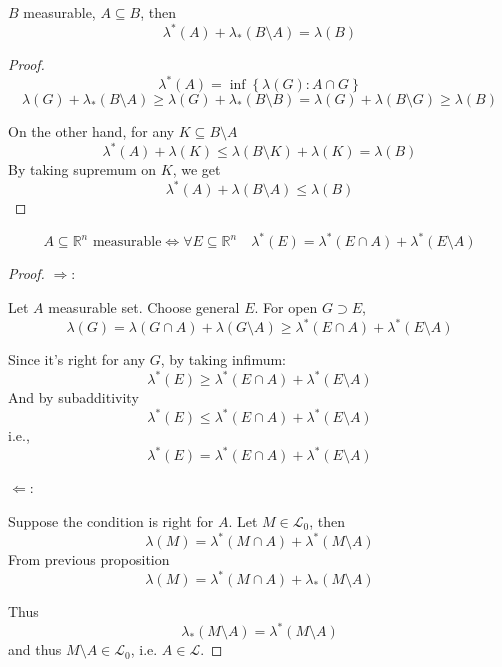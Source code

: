 \begin{prop}
	$B$ measurable, $A\subseteq B$, then
	$$\lambda^*(A) + \lambda_*(B\setminus A) = \lambda(B)$$
	\begin{proof}
		$$\lambda^*(A) = \inf\left\{ \lambda(G) : A\cap G   \right\} $$
		$$\lambda(G) + \lambda_*(B\setminus A) \geq \lambda(G) + \lambda_*(B\setminus B) = \lambda(G) + \lambda(B\setminus G) \geq \lambda(B)$$
		
		
		On the other hand, for any $K\subseteq B\setminus A$
		$$\lambda^*(A) + \lambda(K) \leq \lambda(B\setminus K)+ \lambda(K) = \lambda(B)$$
		By taking supremum on $K$, we get
		$$\lambda^*(A) + \lambda(B\setminus A) \leq  \lambda(B)$$
	\end{proof}


\end{prop}

\begin{prop}
	$$A\subseteq \mathbb{R}^n \text{ measurable} \iff \forall E\subseteq \mathbb{R}^n \quad \lambda^*(E) = \lambda^*(E\cap A)+\lambda^*(E\setminus A)$$
	
	\begin{proof}
		$\Rightarrow$:
		
		Let $A$ measurable set. Choose general $E$. For open $G\supset E$,
		$$\lambda(G) = \lambda(G\cap A) + \lambda(G\setminus A) \geq \lambda^*(E\cap A)+ \lambda^*(E\setminus A)$$
		
		Since it's right for any $G$, by taking infimum:
		$$\lambda^*(E) \geq \lambda^*(E\cap A) + \lambda^*(E\setminus A) $$
		And by subadditivity
		$$\lambda^*(E) \leq \lambda^*(E\cap A) + \lambda^*(E\setminus A) $$
		i.e.,
		$$\lambda^*(E) = \lambda^*(E\cap A) + \lambda^*(E\setminus A) $$
		
		$\Leftarrow$:
		
		Suppose the condition is right for $A$. Let $M\in \mathcal{L}_0$, then
		$$\lambda(M) = \lambda^*(M\cap A) + \lambda^*(M\setminus A)$$
		From previous proposition
		$$\lambda(M) = \lambda^*(M\cap A) + \lambda_*(M\setminus A)$$
		
		Thus
		$$\lambda_*(M\setminus A) = \lambda^*(M\setminus A)$$
		and thus $M\setminus A \in \mathcal{L}_0$, i.e. $A\in \mathcal{L}$.
	\end{proof}
\end{prop}